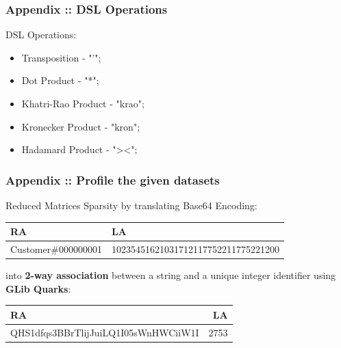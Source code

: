 \documentclass{beamer}
\begin{document}
\begin{frame}
\frametitle{ Appendix :: DSL Operations}
\begin{block}{DSL Operations:}
\begin{itemize}
    \item Transposition - "'";
    \item Dot Product - "*";
    \item Khatri-Rao Product - "krao";
    \item Kronecker Product - "kron";
    \item Hadamard Product - "\textgreater\textless";
\end{itemize}
\end{block}
\end{frame}



\begin{frame}
\frametitle{Appendix :: Profile the given datasets}

Reduced Matrices Sparsity by translating Base64 Encoding:\par
\begin{tabular}{ l l }
\hline

RA & LA \\
\hline
 Customer\#000000001  & 10235451621031712117752211775221200 \\
 \hline
\end{tabular}
\vspace{0.5cm}

into \textbf{2-way association} between a string and a unique integer identifier using \textbf{GLib Quarks}:
\begin{tabular}{ l r }
\hline
RA & LA \\
\hline
 QHS1dfqs3BBrTlijJuiLQ1I05sWnHWCiiW1I  & 2753 \\
 \hline
\end{tabular}
\vspace{0.5cm}

  


\end{frame}
\end{document}
